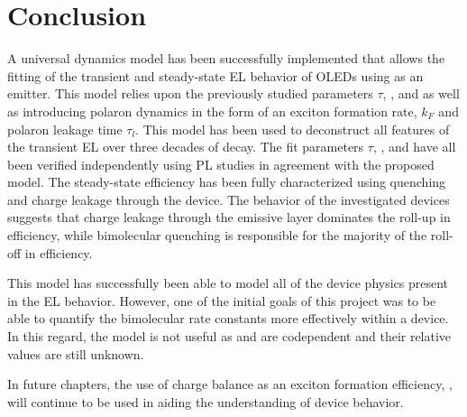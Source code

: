 \documentclass[../thesis.tex]{subfiles}
\begin{document}
\section{Conclusion}

A universal dynamics model has been successfully implemented that allows the fitting of the transient and steady-state EL behavior of OLEDs using \irppy as an emitter. 
This model relies upon the previously studied parameters $\tau$, \ktt, and \ktp as well as introducing polaron dynamics in the form of an exciton formation rate, $k_F$ and polaron leakage time $\tau_l$. 
This model has been used to deconstruct all features of the transient EL over three decades of decay. The fit parameters $\tau$, \ktt, and \ktp have all been verified independently using PL studies in agreement with the proposed model. 
The steady-state efficiency has been fully characterized using quenching and charge leakage through the device. 
The behavior of the investigated devices suggests that charge leakage through the emissive layer dominates the roll-up in efficiency, while bimolecular quenching is responsible for the majority of the roll-off in efficiency.

This model has successfully been able to model all of the device physics present in the EL behavior.  However, one of the initial goals of this project was to be able to quantify the bimolecular rate constants more effectively within a device.  In this regard, the model is not useful as \ktt and \ktp are codependent and their relative values are still unknown.  

In future chapters, the use of charge balance as an exciton formation efficiency, \ef, will continue to be used in aiding the understanding of device behavior.

\end{document}
